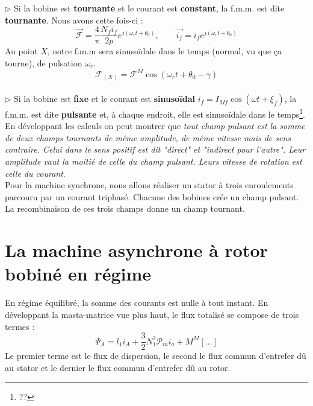 		
		$\triangleright$ Si la bobine est \textbf{tournante} et le courant est 
		\textbf{constant}, la f.m.m. est dite \textbf{tournante}. Nous avons 
		cette fois-ci :
		\begin{equation}
		\vec{\mathcal{F}} = \frac{4}{\pi}\dfrac{N_fi_f}{2p}e^{j(\omega_rt+\theta_0)}, 
		\qquad \vec{i_f} = i_fe^{j(\omega_rt+\theta_0)}
		\end{equation}
		Au point $X$, notre f.m.m sera sinusoïdale dans le temps (normal, vu que ça 
		tourne), de pulsation $\omega_r$.
		\begin{equation}
		\mathcal{F}_{(X)} = \mathcal{F}^M\cos(\omega_rt+\theta_0-\gamma)
		\end{equation}\ \\
		
				
		$\triangleright$ Si la bobine est \textbf{fixe} et le courant est 
		\textbf{sinusoïdal} $i_f = I_{Mf}\cos(\omega t+\xi_f)$, la f.m.m. est 
		dite \textbf{pulsante} et, à chaque endroit, elle est sinusoïdale dans 
		le temps\footnote{??}.\\
		
		En développant les calculs on peut montrer que \textit{tout champ pulsant 
		est la somme de deux champs tournants de même amplitude, de même vitesse 
		mais de sens contraire. Celui dans le sens positif est dit "direct" et 
		"indirect pour l'autre". Leur amplitude vaut la moitié de celle du champ 
		pulsant. Leurs vitesse de rotation est celle du courant}.\\
		
		Pour la machine synchrone, nous allons réaliser un stator à trois enroulements 
		parcouru par un courant triphasé. Chacune des bobines crée un champ pulsant. 
		La recombinaison de ces trois champs donne un champ tournant.
		
\newpage		
\section{La machine asynchrone à rotor bobiné en régime}
En régime équilibré, la somme des courants est nulle à tout instant. En développant 
la masta-matrice vue plus haut, le flux totalisé se compose de trois termes :
\begin{equation}
\Psi_A = l_1i_A + \dfrac{3}{2}N_1^2\mathcal{P}_mi_a + M^M[\dots]
\end{equation}
Le premier terme est le flux de dispersion, le second le flux commun d'entrefer dû 
au stator et le dernier le flux commun d'entrefer dû au rotor.

